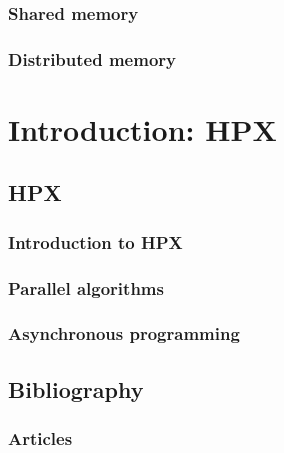 \documentclass[11pt,fleqn]{book} %
\begin{document}
\section{Shared memory}

\section{Distributed memory}

\part{Introduction: HPX}

\chapter{HPX}

\section{Introduction to HPX}

\section{Parallel algorithms}

\section{Asynchronous programming}






\chapter*{Bibliography}


\section*{Articles}
\printbibliography[heading=bibempty,type=article]
\end{document}
